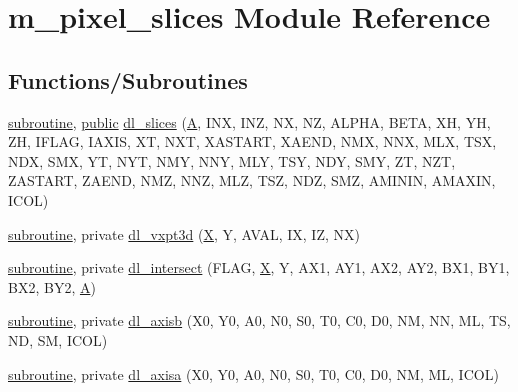 \hypertarget{namespacem__pixel__slices}{}\section{m\+\_\+pixel\+\_\+slices Module Reference}
\label{namespacem__pixel__slices}
\subsection*{Functions/\+Subroutines}
\begin{DoxyCompactItemize}
\item 
\hyperlink{M__stopwatch_83_8txt_acfbcff50169d691ff02d4a123ed70482}{subroutine}, \hyperlink{M__stopwatch_83_8txt_a2f74811300c361e53b430611a7d1769f}{public} \hyperlink{namespacem__pixel__slices_ac9e60bae24d6a1525af0da041bc1cf55}{dl\+\_\+slices} (\hyperlink{ufpp__overview_81_8txt_a8341271e5f4e3003f6eb1c9547fc9d1a}{A}, I\+NX, I\+NZ, NX, NZ, A\+L\+P\+HA, B\+E\+TA, XH, YH, ZH, I\+F\+L\+AG, I\+A\+X\+IS, XT, N\+XT, X\+A\+S\+T\+A\+RT, X\+A\+E\+ND, N\+MX, N\+NX, M\+LX, T\+SX, N\+DX, S\+MX, YT, N\+YT, N\+MY, N\+NY, M\+LY, T\+SY, N\+DY, S\+MY, ZT, N\+ZT, Z\+A\+S\+T\+A\+RT, Z\+A\+E\+ND, N\+MZ, N\+NZ, M\+LZ, T\+SZ, N\+DZ, S\+MZ, A\+M\+I\+N\+IN, A\+M\+A\+X\+IN, I\+C\+OL)
\item 
\hyperlink{M__stopwatch_83_8txt_acfbcff50169d691ff02d4a123ed70482}{subroutine}, private \hyperlink{namespacem__pixel__slices_a61f419d67b700758eceed72e406a37f0}{dl\+\_\+vxpt3d} (\hyperlink{intro__blas1_83_8txt_ac8596739bc875e90fe6e2ecf98e87906}{X}, Y, A\+V\+AL, IX, IZ, NX)
\item 
\hyperlink{M__stopwatch_83_8txt_acfbcff50169d691ff02d4a123ed70482}{subroutine}, private \hyperlink{namespacem__pixel__slices_a1508683ec3b2444091bb34d40b5d8b93}{dl\+\_\+intersect} (F\+L\+AG, \hyperlink{intro__blas1_83_8txt_ac8596739bc875e90fe6e2ecf98e87906}{X}, Y, A\+X1, A\+Y1, A\+X2, A\+Y2, B\+X1, B\+Y1, B\+X2, B\+Y2, \hyperlink{ufpp__overview_81_8txt_a8341271e5f4e3003f6eb1c9547fc9d1a}{A})
\item 
\hyperlink{M__stopwatch_83_8txt_acfbcff50169d691ff02d4a123ed70482}{subroutine}, private \hyperlink{namespacem__pixel__slices_ab70907b4409a4346c450488b5bcb34a8}{dl\+\_\+axisb} (X0, Y0, A0, N0, S0, T0, C0, D0, NM, NN, ML, TS, ND, SM, I\+C\+OL)
\item 
\hyperlink{M__stopwatch_83_8txt_acfbcff50169d691ff02d4a123ed70482}{subroutine}, private \hyperlink{namespacem__pixel__slices_afcc122fe448b5f806c0a372a203cd9ea}{dl\+\_\+axisa} (X0, Y0, A0, N0, S0, T0, C0, D0, NM, ML, I\+C\+OL)

\end{DoxyCompactItemize}
